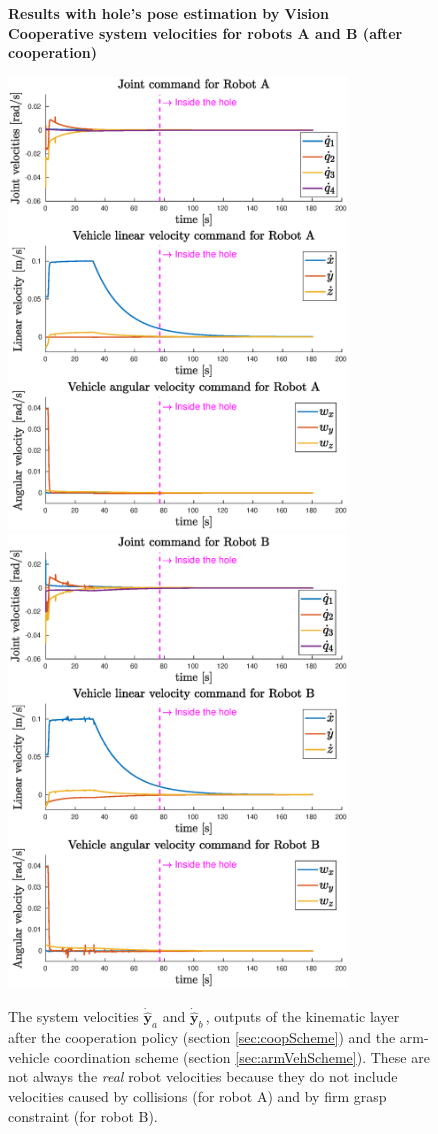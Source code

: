\begin{figure}[H]
	\centering
	\textbf{Results with hole's pose estimation by Vision}\\
	\textbf{Cooperative system velocities for robots A and B (after cooperation)}
	\vspace{20px}
	\centerline{
		\includegraphics[width=9cm]{withVisio/coopJoinVelA.eps}
		\includegraphics[width=9cm]{withVisio/coopJoinVelB.eps}
	}

	\caption[Plots of cooperative robots velocities]{The system velocities $\dot{\hat{\boldsymbol{y}}}_a$ and $\dot{\hat{\boldsymbol{y}}}_b\,$, outputs of the kinematic layer after the cooperation policy (section \ref{sec:coopScheme}) and the arm-vehicle coordination scheme (section \ref{sec:armVehScheme}). These are not always the \emph{real} robot velocities because they do not include velocities caused by collisions (for robot A) and by firm grasp constraint (for robot B).}
	\label{fig:expWithVisioVel}
\end{figure}

